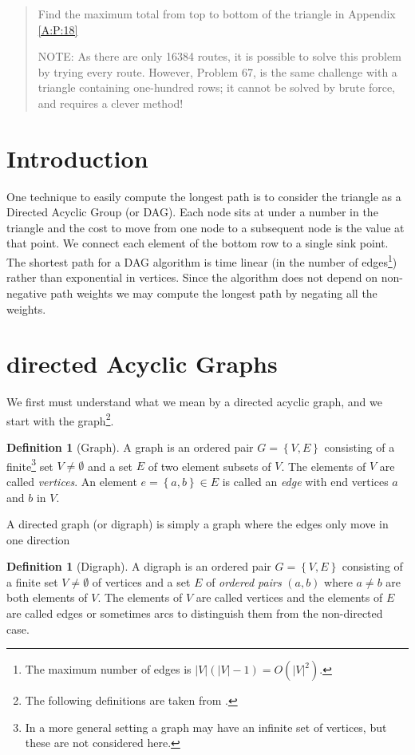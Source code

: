 \documentclass[oneside,12pt]{book}   	%
\newcounter{ex}
\newcounter{def}
\newcounter{pr}
\theoremstyle{definition}
\newtheorem{definition}[thm]{Definition}
\newcommand{\set}[1]{\left\{#1\right\}}
\newcommand{\order}[1]{\left| #1 \right|}
\begin{document}
\begin{spacing}{1.618}
\begin{quote}
			Find the maximum total from top to bottom of the triangle in Appendix \ref{A:P:18}

			NOTE: As there are only 16384 routes, it is possible to solve this problem by trying every route. However, Problem 67, is the same challenge with a triangle containing one-hundred rows; it cannot be solved by brute force, and requires a clever method!
		\end{quote}
		
		\section{Introduction}
			One technique to easily compute the longest path is to consider the triangle as a Directed Acyclic Group (or DAG). Each node sits at under a number in the triangle and the cost to move from one node to a subsequent node is the value at that point. We connect each element of the bottom row to a single sink point. The shortest path for a DAG algorithm is time linear (in the number of edges\footnote{The maximum number of edges is $\order{V}\left(\order{V}-1\right)=O\left(\order{V}^2\right)$.}) rather than exponential in vertices. Since the algorithm does not depend on non-negative path weights we may compute the longest path by negating all the weights. 
			
		\section{directed Acyclic Graphs}
		
			We first must understand what we mean by a directed acyclic graph, and we start with the graph\footnote{The following definitions are taken from \cite{Jung2004}.}. 
			\begin{definition}[Graph]
				A graph is an ordered pair $G=\set{V, E}$ consisting of a finite\footnote{In a more general setting a graph may have an infinite set of vertices, but these are not considered here.} set $V\neq \emptyset$ and a set $E$ of two element subsets of $V$. The elements of $V$ are called \emph{vertices}. An element $e=\set{a, b}\in E$ is called an \emph{edge} with end vertices $a$ and $b$ in $V$. 
			\end{definition}
			
			A directed graph (or digraph) is simply a graph where the edges only move in one direction
			\begin{definition}[Digraph]
				A digraph is an ordered pair $G=\set{V, E}$ consisting of a finite set $V\neq \emptyset$ of vertices and a set $E$ of \emph{ordered pairs} $(a, b)$ where $a\neq b$ are both elements of $V$. The elements of $V$ are called vertices and the elements of $E$ are called edges or sometimes arcs to distinguish them from the non-directed case. 
			\end{definition}
			

\end{spacing}
\end{document}
